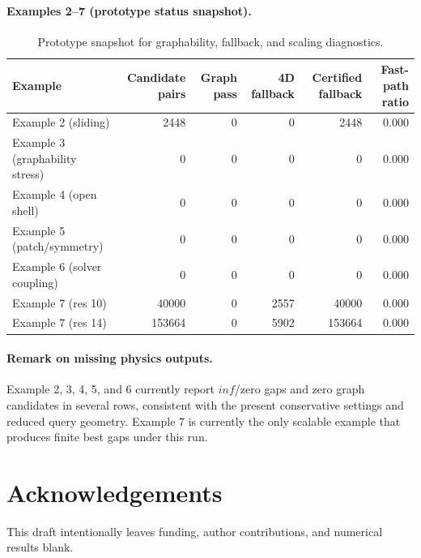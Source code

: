 \documentclass[preprint,12pt]{elsarticle}
\begin{document}
\paragraph{Examples 2--7 (prototype status snapshot).}

\begin{table}[h]
\centering
\caption{Prototype snapshot for graphability, fallback, and scaling diagnostics.}
\label{tab:graph_snapshot}
\begin{tabular}{l r r r r r}
\toprule
Example & Candidate pairs & Graph pass & 4D fallback & Certified fallback & Fast-path ratio \\
\midrule
Example 2 (sliding) & 2448 & 0 & 0 & 2448 & 0.000 \\
Example 3 (graphability stress) & 0 & 0 & 0 & 0 & 0.000 \\
Example 4 (open shell) & 0 & 0 & 0 & 0 & 0.000 \\
Example 5 (patch/symmetry) & 0 & 0 & 0 & 0 & 0.000 \\
Example 6 (solver coupling) & 0 & 0 & 0 & 0 & 0.000 \\
Example 7 (res 10) & 40000 & 0 & 2557 & 40000 & 0.000 \\
Example 7 (res 14) & 153664 & 0 & 5902 & 153664 & 0.000 \\
\bottomrule
\end{tabular}
\end{table}

\paragraph{Remark on missing physics outputs.}
Example 2, 3, 4, 5, and 6 currently report $inf$/zero gaps and zero graph candidates in several rows, consistent with the present conservative settings and reduced query geometry. Example 7 is currently the only scalable example that produces finite best gaps under this run.

\section*{Acknowledgements}
This draft intentionally leaves funding, author contributions, and numerical results blank.
\end{document}
